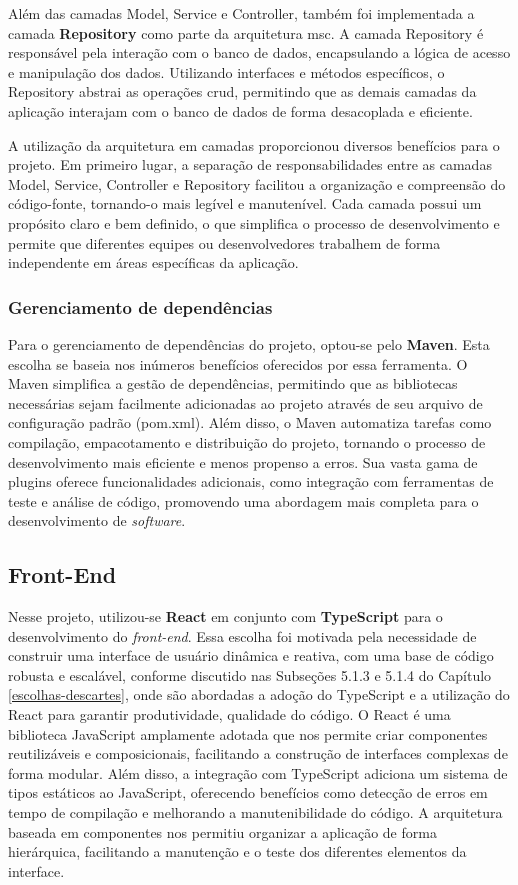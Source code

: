 Além das camadas Model, Service e Controller, também foi implementada a camada \textbf{Repository} como parte da arquitetura \ac{msc}. A camada Repository é responsável pela interação com o banco de dados, encapsulando a lógica de acesso e manipulação dos dados. Utilizando interfaces e métodos específicos, o Repository abstrai as operações \ac{crud}, permitindo que as demais camadas da aplicação interajam com o banco de dados de forma desacoplada e eficiente.

A utilização da arquitetura em camadas proporcionou diversos benefícios para o projeto. Em primeiro lugar, a separação de responsabilidades entre as camadas Model, Service, Controller e Repository facilitou a organização e compreensão do código-fonte, tornando-o mais legível e manutenível. Cada camada possui um propósito claro e bem definido, o que simplifica o processo de desenvolvimento e permite que diferentes equipes ou desenvolvedores trabalhem de forma independente em áreas específicas da aplicação.

\subsubsection{Gerenciamento de dependências}
Para o gerenciamento de dependências do projeto, optou-se pelo \textbf{Maven}. Esta escolha se baseia nos inúmeros benefícios oferecidos por essa ferramenta. O Maven simplifica a gestão de dependências, permitindo que as bibliotecas necessárias sejam facilmente adicionadas ao projeto através de seu arquivo de configuração padrão (pom.xml). Além disso, o Maven automatiza tarefas como compilação, empacotamento e distribuição do projeto, tornando o processo de desenvolvimento mais eficiente e menos propenso a erros. Sua vasta gama de plugins oferece funcionalidades adicionais, como integração com ferramentas de teste e análise de código, promovendo uma abordagem mais completa para o desenvolvimento de \textit{software}. 

\subsection{Front-End}
\label{frontend}

Nesse projeto, utilizou-se \textbf{React} em conjunto com \textbf{TypeScript} para o desenvolvimento do \textit{front-end}. Essa escolha foi motivada pela necessidade de construir uma interface de usuário dinâmica e reativa, com uma base de código robusta e escalável, conforme discutido nas Subseções 5.1.3 e 5.1.4 do Capítulo \ref{escolhas-descartes}, onde são abordadas a adoção do TypeScript e a utilização do React para garantir produtividade, qualidade do código. O React é uma biblioteca JavaScript amplamente adotada que nos permite criar componentes reutilizáveis e composicionais, facilitando a construção de interfaces complexas de forma modular. Além disso, a integração com TypeScript adiciona um sistema de tipos estáticos ao JavaScript, oferecendo benefícios como detecção de erros em tempo de compilação e melhorando a manutenibilidade do código. A arquitetura baseada em componentes nos permitiu organizar a aplicação de forma hierárquica, facilitando a manutenção e o teste dos diferentes elementos da interface.

